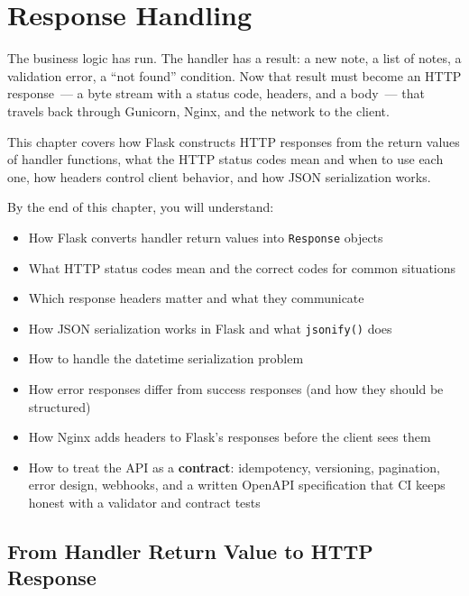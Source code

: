 \setcounter{chapter}{33}
\chapter{Response Handling}\label{ch:34-response-handling}

\chapterrule

The business logic has run. The handler has a result: a new note, a list of notes, a validation error, a ``not found'' condition. Now that result must become an HTTP response~--- a byte stream with a status code, headers, and a body~--- that travels back through Gunicorn, Nginx, and the network to the client.

This chapter covers how Flask constructs HTTP responses from the return values of handler functions, what the HTTP status codes mean and when to use each one, how headers control client behavior, and how JSON serialization works.

\begin{objectives}

By the end of this chapter, you will understand:

\begin{itemize}
\tightlist
\item
  How Flask converts handler return values into \texttt{Response} objects
\item
  What HTTP status codes mean and the correct codes for common situations
\item
  Which response headers matter and what they communicate
\item
  How JSON serialization works in Flask and what \texttt{jsonify()} does
\item
  How to handle the datetime serialization problem
\item
  How error responses differ from success responses (and how they should be structured)
\item
  How Nginx adds headers to Flask's responses before the client sees them
\item
  How to treat the API as a \textbf{contract}: idempotency, versioning, pagination, error design, webhooks, and a written OpenAPI specification that CI keeps honest with a validator and contract tests
\end{itemize}

\end{objectives}

\setcounter{section}{0}
\section{From Handler Return Value to HTTP Response}\label{34-response-handling:341-from-handler-return-value-to-http-response}

